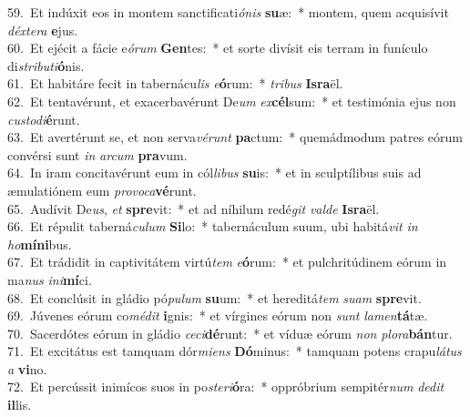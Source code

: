 {59.~}Et indúxit eos in montem sanctificati\textit{ó}\textit{nis} \textbf{su}æ:~* montem, quem acquisívit \textit{déx}\textit{te}\textit{ra} \textbf{e}jus.\\
{60.~}Et ejécit a fácie e\textit{ó}\textit{rum} \textbf{Gen}tes:~* et sorte divísit eis terram in funículo di\textit{stri}\textit{bu}\textit{ti}\textbf{ó}nis.\\
{61.~}Et habitáre fecit in tabernácu\textit{lis} \textit{e}\textbf{ó}rum:~* \textit{tri}\textit{bus} \textbf{Is}\textbf{ra}ël.\\
{62.~}Et tentavérunt, et exacerbavérunt De\textit{um} \textit{ex}\textbf{cél}sum:~* et testimónia ejus non \textit{cu}\textit{sto}\textit{di}\textbf{é}runt.\\
{63.~}Et avertérunt se, et non serva\textit{vé}\textit{runt} \textbf{pa}ctum:~* quemádmodum patres eórum convérsi sunt \textit{in} \textit{ar}\textit{cum} \textbf{pra}vum.\\
{64.~}In iram concitavérunt eum in cól\textit{li}\textit{bus} \textbf{su}is:~* et in sculptílibus suis ad æmulatiónem eum \textit{pro}\textit{vo}\textit{ca}\textbf{vé}runt.\\
{65.~}Audívit De\textit{us}, \textit{et} \textbf{spre}vit:~* et ad níhilum redé\textit{git} \textit{val}\textit{de} \textbf{Is}\textbf{ra}ël.\\
{66.~}Et répulit taberná\textit{cu}\textit{lum} \textbf{Si}lo:~* tabernáculum suum, ubi habitá\textit{vit} \textit{in} \textit{ho}\textbf{mí}\textbf{ni}bus.\\
{67.~}Et trádidit in captivitátem virtú\textit{tem} \textit{e}\textbf{ó}rum:~* et pulchritúdinem eórum in ma\textit{nus} \textit{i}\textit{ni}\textbf{mí}ci.\\
{68.~}Et conclúsit in gládio pó\textit{pu}\textit{lum} \textbf{su}um:~* et hereditá\textit{tem} \textit{su}\textit{am} \textbf{spre}vit.\\
{69.~}Júvenes eórum co\textit{mé}\textit{dit} \textbf{i}gnis:~* et vírgines eórum non \textit{sunt} \textit{la}\textit{men}\textbf{tá}tæ.\\
{70.~}Sacerdótes eórum in gládio \textit{ce}\textit{ci}\textbf{dé}runt:~* et víduæ eórum \textit{non} \textit{plo}\textit{ra}\textbf{bán}tur.\\
{71.~}Et excitátus est tamquam dór\textit{mi}\textit{ens} \textbf{Dó}minus:~* tamquam potens crapu\textit{lá}\textit{tus} \textit{a} \textbf{vi}no.\\
{72.~}Et percússit inimícos suos in po\textit{ste}\textit{ri}\textbf{ó}ra:~* oppróbrium sempitér\textit{num} \textit{de}\textit{dit} \textbf{il}lis.\\
